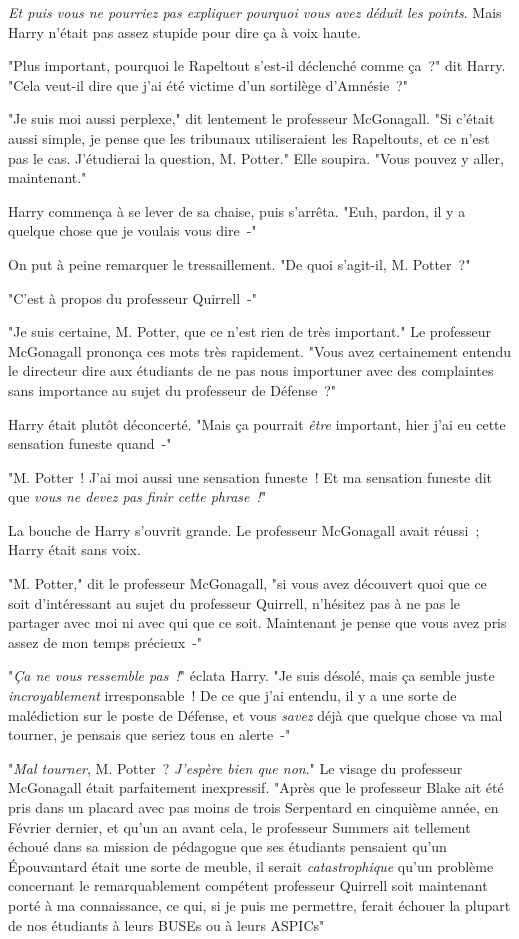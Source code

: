 \emph{Et puis vous ne pourriez pas expliquer pourquoi vous avez déduit les points}. Mais Harry n'était pas assez stupide pour dire ça à voix haute.

"Plus important, pourquoi le Rapeltout s'est-il déclenché comme ça~?" dit Harry. "Cela veut-il dire que j'ai été victime d'un sortilège d'Amnésie~?"

"Je suis moi aussi perplexe," dit lentement le professeur McGonagall. "Si c'était aussi simple, je pense que les tribunaux utiliseraient les Rapeltouts, et ce n'est pas le cas. J'étudierai la question, M. Potter." Elle soupira. "Vous pouvez y aller, maintenant."

Harry commença à se lever de sa chaise, puis s'arrêta. "Euh, pardon, il y a quelque chose que je voulais vous dire~-"

On put à peine remarquer le tressaillement. "De quoi s'agit-il, M. Potter~?"

"C'est à propos du professeur Quirrell~-"

"Je suis certaine, M. Potter, que ce n'est rien de très important." Le professeur McGonagall prononça ces mots très rapidement. "Vous avez certainement entendu le directeur dire aux étudiants de ne pas nous importuner avec des complaintes sans importance au sujet du professeur de Défense~?"

Harry était plutôt déconcerté. "Mais ça pourrait \emph{être} important, hier j'ai eu cette sensation funeste quand~-"

"M. Potter~! J'ai moi aussi une sensation funeste~! Et ma sensation funeste dit que \emph{vous ne devez pas finir cette phrase~!}"

La bouche de Harry s'ouvrit grande. Le professeur McGonagall avait réussi~; Harry était sans voix.

"M. Potter," dit le professeur McGonagall, "si vous avez découvert quoi que ce soit d'intéressant au sujet du professeur Quirrell, n'hésitez pas à ne pas le partager avec moi ni avec qui que ce soit. Maintenant je pense que vous avez pris assez de mon temps précieux~-"

"\emph{Ça ne vous ressemble pas~!}" éclata Harry. "Je suis désolé, mais ça semble juste \emph{incroyablement} irresponsable~! De ce que j'ai entendu, il y a une sorte de malédiction sur le poste de Défense, et vous \emph{savez} déjà que quelque chose va mal tourner, je pensais que seriez tous en alerte~-"

"\emph{Mal tourner}, M. Potter~? \emph{J'espère bien que non}." Le visage du professeur McGonagall était parfaitement inexpressif. "Après que le professeur Blake ait été pris dans un placard avec pas moins de trois Serpentard en cinquième année, en Février dernier, et qu'un an avant cela, le professeur Summers ait tellement échoué dans sa mission de pédagogue que ses étudiants pensaient qu'un Épouvantard était une sorte de meuble, il serait \emph{catastrophique} qu'un problème concernant le remarquablement compétent professeur Quirrell soit maintenant porté à ma connaissance, ce qui, si je puis me permettre, ferait échouer la plupart de nos étudiants à leurs BUSEs ou à leurs ASPICs"

